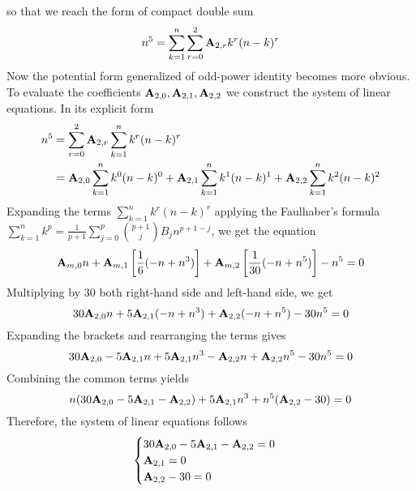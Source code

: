 so that we reach the form of compact double sum
\begin{equation*}
    n^5 = \sum_{k=1}^{n} \sum_{r=0}^{2} {\mathbf{A}} \sb{2,r} k^r (n-k)^r
\end{equation*}
Now the potential form generalized of odd-power identity becomes more obvious.
To evaluate the coefficients ${\mathbf{A}} \sb{2,0}, {\mathbf{A}} \sb{2,1}, {\mathbf{A}} \sb{2,2}$
we construct the system of linear equations.
In its explicit form
\begin{equation*}
    \begin{split}
        n^5 &= \sum_{r=0}^{2} {\mathbf{A}} \sb{2,r} \sum_{k=1}^{n} k^r (n-k)^r \\
        &= {\mathbf{A}} \sb{2,0} \sum_{k=1}^{n} k^0 (n-k)^0 + {\mathbf{A}} \sb{2,1} \sum_{k=1}^{n} k^1 (n-k)^1 + {\mathbf{A}} \sb{2,2} \sum_{k=1}^{n} k^2 (n-k)^2
    \end{split}
\end{equation*}
Expanding the terms $\sum_{k=1}^{n} k^r (n-k)^r$ applying the
Faulhaber's formula $\sum_{k=1}^{n}k^{p} = \frac{1}{p+1} \sum_{j=0}^{p} \binom{p+1}{j} B_{j} n^{p+1-j}$, we get the equation
\begin{equation*}
    {\mathbf{A}} \sb{m,0} n
    + {\mathbf{A}} \sb{m,1} \left[ \frac{1}{6} (-n + n^3) \right]
    + {\mathbf{A}} \sb{m,2} \left[ \frac{1}{30} (-n + n^5) \right] - n^5 = 0
\end{equation*}
Multiplying by $30$ both right-hand side and left-hand side, we get
\begin{equation*}
    30 {\mathbf{A}} \sb{2,0} n + 5 {\mathbf{A}} \sb{2,1} (-n + n^3) + {\mathbf{A}} \sb{2,2} (-n + n^5) - 30n^5 = 0
\end{equation*}
Expanding the brackets and rearranging the terms gives
\begin{equation*}
    30 {\mathbf{A}} \sb{2,0} - 5 {\mathbf{A}} \sb{2,1} n + 5 {\mathbf{A}} \sb{2,1} n^3 - {\mathbf{A}} \sb{2,2} n + {\mathbf{A}} \sb{2,2} n^5 - 30n^5 = 0
\end{equation*}
Combining the common terms yields
\begin{equation*}
    n (30 {\mathbf{A}} \sb{2,0} - 5 {\mathbf{A}} \sb{2,1} - {\mathbf{A}} \sb{2,2}) + 5 {\mathbf{A}} \sb{2,1} n^3 + n^5 ({\mathbf{A}} \sb{2,2} - 30) = 0
\end{equation*}
Therefore, the system of linear equations follows
\begin{equation*}
    \begin{cases}
        30 {\mathbf{A}} \sb{2,0} - 5 {\mathbf{A}} \sb{2,1} - {\mathbf{A}} \sb{2,2} = 0 \\
        {\mathbf{A}} \sb{2,1} = 0 \\
        {\mathbf{A}} \sb{2,2} - 30 = 0
    \end{cases}
\end{equation*}
